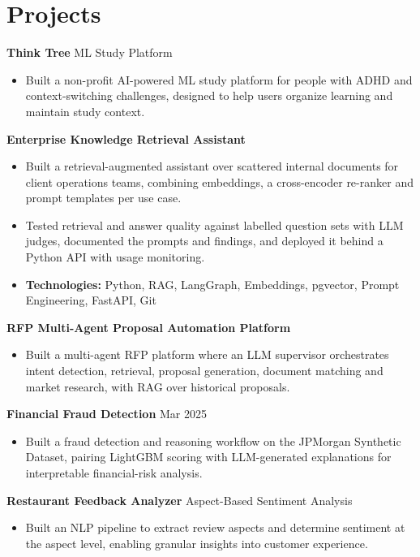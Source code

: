 \documentclass[10pt,a4paper]{article}
\begin{document}
\section{Projects}
\textbf{Think Tree} \textbar{} ML Study Platform\par
\begin{itemize}
  \item Built a non-profit AI-powered ML study platform for people with ADHD and context-switching challenges, designed to help users organize learning and maintain study context.
\end{itemize}
\textbf{Enterprise Knowledge Retrieval Assistant}\par
\begin{itemize}
  \item Built a retrieval-augmented assistant over scattered internal documents for client operations teams, combining embeddings, a cross-encoder re-ranker and prompt templates per use case.
  \item Tested retrieval and answer quality against labelled question sets with LLM judges, documented the prompts and findings, and deployed it behind a Python API with usage monitoring.
  \item \textbf{Technologies:} Python, RAG, LangGraph, Embeddings, pgvector, Prompt Engineering, FastAPI, Git
\end{itemize}
\textbf{RFP Multi-Agent Proposal Automation Platform}\par
\begin{itemize}
  \item Built a multi-agent RFP platform where an LLM supervisor orchestrates intent detection, retrieval, proposal generation, document matching and market research, with RAG over historical proposals.
\end{itemize}
\textbf{Financial Fraud Detection} \textbar{} Mar 2025\par
\begin{itemize}
  \item Built a fraud detection and reasoning workflow on the JPMorgan Synthetic Dataset, pairing LightGBM scoring with LLM-generated explanations for interpretable financial-risk analysis.
\end{itemize}
\textbf{Restaurant Feedback Analyzer} \textbar{} Aspect-Based Sentiment Analysis\par
\begin{itemize}
  \item Built an NLP pipeline to extract review aspects and determine sentiment at the aspect level, enabling granular insights into customer experience.
\end{itemize}
\end{document}

